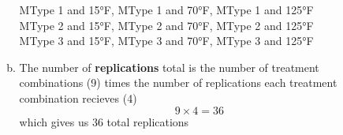 \documentclass[14pt]{article}
\newcommand{\bd}{\textbf}
\begin{document}
\begin{enumerate}
\begin{enumerate}[(a)]
MType 1 and 15\si{\degree}F, MType 1 and 70\si{\degree}F, MType 1 and 125\si{\degree}F \\
MType 2 and 15\si{\degree}F, MType 2 and 70\si{\degree}F, MType 2 and 125\si{\degree}F \\
MType 3 and 15\si{\degree}F, MType 3 and 70\si{\degree}F, MType 3 and 125\si{\degree}F \\

\item
The number of \bd{replications} total is the number of treatment combinations (9) times the number of replications each treatment combination recieves (4)
\[
9 \times 4 = 36
\]
which gives us 36 total replications 

\end{enumerate}

\end{enumerate}
\end{document}
